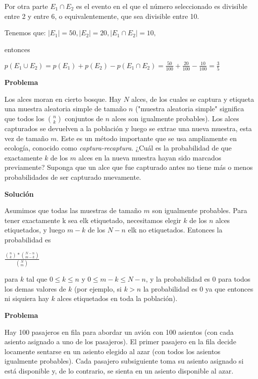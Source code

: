 Por otra parte $E_1 \cap E_2$ es el evento en el que el número seleccionado es
divisible entre 2 y entre 6, o equivalentemente, que sea divisible entre 10.

Tenemos que:
$|E_1|=50, |E_2|=20,|E_1 \cap E_2|=10,$

entonces

\begin{center}
$p(E_1 \cup E_2)=p(E_1)+p(E_2)-p(E_1 \cap E_2) = \frac{50}{100} + \frac{20}{100}
- \frac{10}{100} = \frac{3}{5}$
\end{center}


\textbf{Problema}

Los alces moran en cierto bosque. Hay $N$ alces, de los cuales se captura y
etiqueta una muestra aleatoria simple de tamaño $n$ ("muestra aleatoria simple"
significa que todos los $\binom{n}{k}$ conjuntos de $n$ alces son igualmente
probables). Los alces capturados se devuelven a la población y luego se extrae
una nueva muestra, esta vez de tamaño $m$. Este es un método importante que se
usa ampliamente en ecología, conocido como \textit{captura-recaptura}. ¿Cuál es
la probabilidad de que exactamente $k$ de los $m$ alces en la nueva muestra
hayan sido marcados previamente? Suponga que un alce que fue capturado antes no
tiene más o menos probabilidades de ser capturado nuevamente.

\textbf{Solución}

Asumimos que todas las muestras de tamaño $m$ son igualmente probables. Para
tener exactamente k sea elk etiquetado, necesitamos elegir $k$ de los $n$ alces
etiquetados, y luego $m-k$ de los $N-n$ elk no etiquetados. Entonces la
probabilidad es

\begin{center}
$\frac{\binom{n}{k}*\binom{N-n}{m-k}}{\binom{N}{m}}$
\end{center}

para $k$ tal que $0 \leq k \leq n$ y $0 \leq m-k \leq N-n$, y la probabilidad es
0 para todos los demas valores de $k$ (por ejemplo, si $k > n$ la
probabilidad es 0 ya que entonces ni siquiera hay $k$ alces etiquetados en toda
la población).

\textbf{Problema}

Hay 100 pasajeros en fila para abordar un avión con 100 asientos (con cada
asiento asignado a uno de los pasajeros). El primer pasajero en la fila decide
locamente sentarse en un asiento elegido al azar (con todos los asientos
igualmente probables). Cada pasajero subsiguiente toma su asiento asignado si
está disponible y, de lo contrario, se sienta en un asiento disponible al azar.

